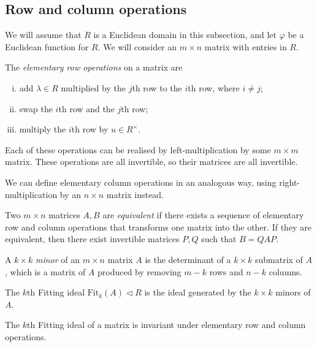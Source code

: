 \subsection{Row and column operations}
We will assume that \( R \) is a Euclidean domain in this subsection, and let \( \varphi \) be a Euclidean function for \( R \).
We will consider an \( m \times n \) matrix with entries in \( R \).
\begin{definition}
	The \textit{elementary row operations} on a matrix are
	\begin{enumerate}[(i)]
		\item add \( \lambda \in R \) multiplied by the \( j \)th row to the \( i \)th row, where \( i \neq j \);
		\item swap the \( i \)th row and the \( j \)th row;
		\item multiply the \( i \)th row by \( u \in R^\times \).
	\end{enumerate}
	Each of these operations can be realised by left-multiplication by some \( m \times m \) matrix.
	These operations are all invertible, so their matrices are all invertible.
\end{definition}
We can define elementary column operations in an analogous way, using right-multiplication by an \( n \times n \) matrix instead.
\begin{definition}
	Two \( m \times n \) matrices \( A, B \) are \textit{equivalent} if there exists a sequence of elementary row and column operations that transforms one matrix into the other.
	If they are equivalent, then there exist invertible matrices \( P, Q \) such that \( B = QAP \).
\end{definition}
\begin{definition}
	A \( k \times k \) \textit{minor} of an \( m \times n \) matrix \( A \) is the determinant of a \( k \times k \) submatrix of \( A \), which is a matrix of \( A \) produced by removing \( m-k \) rows and \( n-k \) columns.

	The \( k \)th Fitting ideal \( \mathrm{Fit}_k(A) \triangleleft R \) is the ideal generated by the \( k \times k \) minors of \( A \).
\end{definition}
\begin{lemma}
	The \( k \)th Fitting ideal of a matrix is invariant under elementary row and column operations.
\end{lemma}
